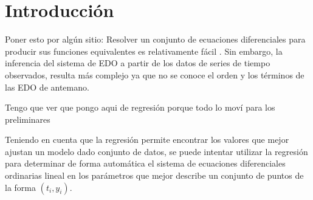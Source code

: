 \chapter*{Introducción}\label{chapter:introduction}

\qquad

Poner esto por algún sitio:
Resolver un conjunto de ecuaciones diferenciales para producir sus funciones equivalentes es relativamente fácil \cite{iba2008inference}. Sin embargo, la inferencia del sistema de EDO a partir de los datos de series de tiempo observados, resulta más complejo ya que no se conoce el orden y los términos de las EDO de antemano.

Tengo que ver que pongo aqui de regresión porque todo lo moví para los preliminares




Teniendo en cuenta que la regresión permite encontrar los valores que mejor ajustan un modelo dado conjunto de datos, se puede intentar utilizar la regresión para determinar de forma automática el sistema de ecuaciones diferenciales ordinarias lineal en los parámetros que mejor describe un conjunto de puntos de la forma $(t_i, y_i)$.

